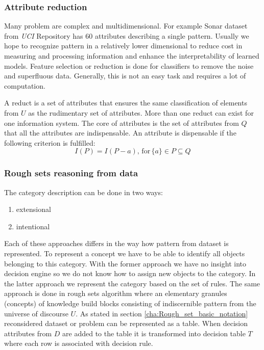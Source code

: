 \subsubsection{Attribute reduction }
\label{cha:Rough_set_attribute_reduction}
Many problem are complex and multidimensional. For example Sonar dataset from
\textit{UCI} Repository has 60 attributes describing a single pattern. 
Usually we hope to recognize pattern in a relatively
lower dimensional to reduce cost in measuring and processing information and
enhance the interpretability of learned models. Feature selection or reduction 
is done for classifiers to remove the noise and superfluous data. Generally,
this is not an easy task and requires a lot of computation. 


A reduct is a set of attributes that ensures the same classification of
elements from $U$ as the rudimentary set of attributes. More than one reduct
can exist for one information system. The core of attributes is the set of
attributes from $Q$ that all the attributes are indispensable. An attribute is
dispensable if the following criterion is fulfilled:
$$I(P) = I(P-{a}), \, \textrm{for} \, \{a\} \in P \subseteq  Q $$

\subsubsection{Rough sets reasoning from data}
The category description can be done in two ways:
\begin{enumerate}
    \item extensional
    \item intentional
\end{enumerate}
Each of these approaches differs in the way how pattern from dataset is
represented. To represent a concept we have to be able to identify all objects belonging 
to this category. With the former approach we have no insight 
into decision engine so we do not know how to assign new objects to the category.
In the latter approach we represent the category based on the set of rules. The same 
approach is done in rough sets algorithm where an elementary 
granules (concepts) of knowledge build blocks consisting 
of indiscernible pattern from the universe of discourse $U$. 
As stated in section \ref{cha:Rough_set_basic_notation} reconsidered dataset or
problem can be represented as a table. When decision attributes from $D$ are
added to the table it is transformed into decision table $T$ where each
row is associated with decision rule.

